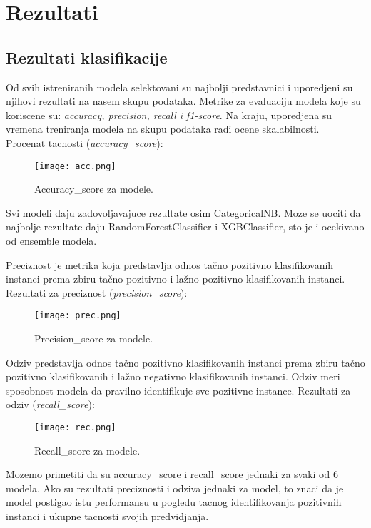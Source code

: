 \documentclass[10pt]{article}
\begin{document}
\newpage
\section{Rezultati}
\subsection*{Rezultati klasifikacije}
Od svih istreniranih modela selektovani su najbolji predstavnici i uporedjeni su njihovi rezultati na nasem skupu podataka. Metrike za evaluaciju modela koje su koriscene su: \textit{accuracy, precision, recall i f1-score}. Na kraju, uporedjena su vremena treniranja modela na skupu podataka radi ocene skalabilnosti.\\

Procenat tacnosti (\textit{accuracy\_score}):
\begin{figure}[h]
    \centering
    \texttt{[image: acc.png]}
    \caption{Accuracy\_score za modele.}
    \label{Slika1}
\end{figure}

Svi modeli daju zadovoljavajuce rezultate osim CategoricalNB. Moze se uociti da najbolje rezultate daju RandomForestClassifier i XGBClassifier, sto je i ocekivano od ensemble modela.\\
\pagebreak

Preciznost je metrika koja predstavlja odnos tačno pozitivno klasifikovanih instanci prema zbiru tačno pozitivno i lažno pozitivno klasifikovanih instanci. Rezultati za preciznost (\textit{precision\_score}):
\begin{figure}[h]
    \centering
    \texttt{[image: prec.png]}
    \caption{Precision\_score za modele.}
    \label{Slika2}
\end{figure}

Odziv predstavlja odnos tačno pozitivno klasifikovanih instanci prema zbiru tačno pozitivno klasifikovanih i lažno negativno klasifikovanih instanci. Odziv meri sposobnost modela da pravilno identifikuje sve pozitivne instance. Rezultati za odziv (\textit{recall\_score}):
\begin{figure}[h]
    \centering
    \texttt{[image: rec.png]}
    \caption{Recall\_score za modele.}
    \label{Slika3}
\end{figure}

Mozemo primetiti da su accuracy\_score i recall\_score jednaki za svaki od 6 modela. Ako su rezultati preciznosti i odziva jednaki za model, to znaci da je model postigao istu performansu u pogledu tacnog identifikovanja pozitivnih instanci i ukupne tacnosti svojih predvidjanja.\\
\end{document}
